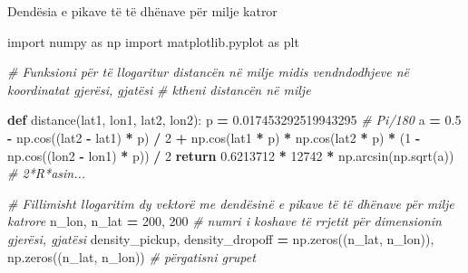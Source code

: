 \documentclass[
  ignorenonframetext,
]{beamer}
\newenvironment{Shaded}{\begin{snugshade}}{\end{snugshade}}
\newcommand{\CommentTok}[1]{\textcolor[rgb]{0.56,0.35,0.01}{\textit{#1}}}
\newcommand{\ControlFlowTok}[1]{\textcolor[rgb]{0.13,0.29,0.53}{\textbf{#1}}}
\newcommand{\DecValTok}[1]{\textcolor[rgb]{0.00,0.00,0.81}{#1}}
\newcommand{\FloatTok}[1]{\textcolor[rgb]{0.00,0.00,0.81}{#1}}
\newcommand{\ImportTok}[1]{#1}
\newcommand{\KeywordTok}[1]{\textcolor[rgb]{0.13,0.29,0.53}{\textbf{#1}}}
\newcommand{\NormalTok}[1]{#1}
\newcommand{\OperatorTok}[1]{\textcolor[rgb]{0.81,0.36,0.00}{\textbf{#1}}}
\begin{document}
\begin{frame}[fragile]{Dendësia e pikave të të dhënave për milje katror}
\protect\hypertarget{denduxebsia-e-pikave-tuxeb-tuxeb-dhuxebnave-puxebr-milje-katror-2}{}

\begin{Shaded}
\begin{Highlighting}[]
\ImportTok{import}\NormalTok{ numpy }\ImportTok{as}\NormalTok{ np}
\ImportTok{import}\NormalTok{ matplotlib.pyplot }\ImportTok{as}\NormalTok{ plt}

\CommentTok{\# Funksioni për të llogaritur distancën në milje midis vendndodhjeve në koordinatat gjerësi, gjatësi}
\CommentTok{\# ktheni distancën në milje}

\KeywordTok{def}\NormalTok{ distance(lat1, lon1, lat2, lon2):}
\NormalTok{    p }\OperatorTok{=} \FloatTok{0.017453292519943295}  \CommentTok{\# Pi/180}
\NormalTok{    a }\OperatorTok{=} \FloatTok{0.5} \OperatorTok{{-}}\NormalTok{ np.cos((lat2 }\OperatorTok{{-}}\NormalTok{ lat1) }\OperatorTok{*}\NormalTok{ p) }\OperatorTok{/} \DecValTok{2} \OperatorTok{+}\NormalTok{ np.cos(lat1 }\OperatorTok{*}\NormalTok{ p) }\OperatorTok{*} 
\NormalTok{    np.cos(lat2 }\OperatorTok{*}\NormalTok{ p) }\OperatorTok{*}\NormalTok{ (}\DecValTok{1} \OperatorTok{{-}}\NormalTok{ np.cos((lon2 }\OperatorTok{{-}}\NormalTok{ lon1) }\OperatorTok{*}\NormalTok{ p)) }\OperatorTok{/} \DecValTok{2}
    \ControlFlowTok{return} \FloatTok{0.6213712} \OperatorTok{*} \DecValTok{12742} \OperatorTok{*}\NormalTok{ np.arcsin(np.sqrt(a))  }\CommentTok{\# 2*R*asin...}

\CommentTok{\# Fillimisht llogaritim dy vektorë me dendësinë e pikave të të dhënave për milje katrore}
\NormalTok{n\_lon, n\_lat }\OperatorTok{=} \DecValTok{200}\NormalTok{, }\DecValTok{200}  \CommentTok{\# numri i koshave të rrjetit për dimensionin gjerësi, gjatësi}
\NormalTok{density\_pickup, density\_dropoff }\OperatorTok{=}\NormalTok{ np.zeros((n\_lat, n\_lon)), np.zeros((n\_lat, n\_lon))  }\CommentTok{\# përgatisni grupet}
\end{Highlighting}
\end{Shaded}
\end{frame}
\end{document}
